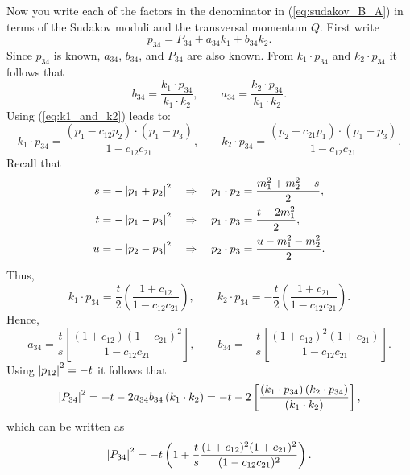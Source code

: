Now you write each of the factors in the denominator in (\ref{eq:sudakov_B_A}) in terms of the Sudakov moduli and the transversal momentum $Q$. First write
\begin{equation}
	p_{34} = P_{34} + a_{34} k_{1} + b_{34} k_{2}.
\end{equation}
Since $p_{34}$ is known, $a_{34}$, $b_{34}$, and $P_{34}$ are also known. From $k_{1} \cdot p_{34}$ and $k_{2} \cdot p_{34}$ it follows that
\begin{equation}
	b_{34} = \frac{k_{1} \cdot p_{34}}{k_{1} \cdot k_{2}}, \qquad a_{34} = \frac{k_{2} \cdot p_{34}}{k_{1} \cdot k_{2}}.
\end{equation}
Using (\ref{eq:k1_and_k2}) leads to:
\begin{equation}
	k_{1} \cdot p_{34} = \frac{(p_{1} - c_{12} p_{2}) \cdot (p_{1} - p_{3})}{1 - c_{12} c_{21}}, \qquad k_{2} \cdot p_{34} = \frac{(p_{2} - c_{21} p_{1}) \cdot (p_{1} - p_{3})}{1 - c_{12} c_{21}}.
\end{equation}
Recall that
\begin{align}
	s = -\left\lvert p_{1} + p_{2} \right\rvert^{2} \quad &\Rightarrow \quad p_{1} \cdot p_{2} = \frac{m_{1}^{2} + m_{2}^{2} - s}{2}, \\
	t = -\left\lvert p_{1} - p_{3} \right\rvert^{2} \quad &\Rightarrow \quad p_{1} \cdot p_{3} = \frac{t - 2m_{1}^{2}}{2}, \\
	u = -\left\lvert p_{2} - p_{3} \right\rvert^{2} \quad &\Rightarrow \quad p_{2} \cdot p_{3} = \frac{u - m_{1}^{2} - m_{2}^{2}}{2}. \\
\end{align}
Thus,
\begin{equation}
	k_{1} \cdot p_{34} = \frac{t}{2} \left( \frac{1 + c_{12}}{1 - c_{12} c_{21}} \right), \qquad k_{2} \cdot p_{34} = -\frac{t}{2} \left( \frac{1 + c_{21}}{1 - c_{12} c_{21}} \right).
\end{equation}
Hence,
\begin{equation}
	a_{34} = \frac{t}{s} \left[ \frac{(1 + c_{12}) (1 + c_{21})^{2}}{1 - c_{12} c_{21}} \right], \qquad b_{34} = -\frac{t}{s} \left[ \frac{(1 + c_{12})^{2} (1 + c_{21})}{1 - c_{12} c_{21}} \right].
\end{equation}
Using $\left\lvert p_{12} \right\rvert^{2} = -t$ it follows that
\begin{equation}
	\left\lvert P_{34} \right\rvert^{2} = -t - 2 a_{34} b_{34} \left(k_{1} \cdot k_{2}\right) = -t - 2 \left[ \frac{\left(k_{1} \cdot p_{34}\right) \left(k_{2} \cdot p_{34}\right)}{\left(k_{1} \cdot k_{2}\right)} \right],
\end{equation}
which can be written as
\begin{equation}
	\left\lvert P_{34} \right\rvert^{2} = -t \left( 1 + \frac{t}{s} \frac{(1 + c_{12})^{2}(1 + c_{21})^{2}}{(1 - c_{12} c_{21})^{2}} \right).
\end{equation}
